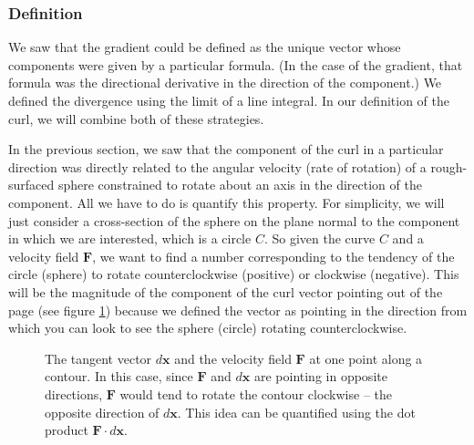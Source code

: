 \documentclass{myarticle}
\renewcommand{\vec}[1]{\mathbf{#1}}
\theoremstyle{nospace}
\newtheorem{old series theorem}{Theorem}
\newenvironment{series theorem}
{\begin{mdframed}\begin{old series theorem}}
    {\end{old series theorem}\end{mdframed}}
\begin{document}
\subsubsection{Definition}
\label{sec:curl definition}

We saw that the gradient could be defined as the unique vector whose
components were given by a particular formula. (In the case of the
gradient, that formula was the directional derivative in the direction
of the component.) We defined the divergence using the limit of a line
integral. In our definition of the curl, we will combine both of these
strategies.

In the previous section, we saw that the component of the curl in a
particular direction was directly related to the angular velocity
(rate of rotation) of a rough-surfaced sphere constrained to rotate
about an axis in the direction of the component. All we have to do is
quantify this property. For simplicity, we will just consider a
cross-section of the sphere on the plane normal to the component in
which we are interested, which is a circle $C$. So given the curve $C$
and a velocity field $\vec{F}$, we want to find a number corresponding
to the tendency of the circle (sphere) to rotate counterclockwise
(positive) or clockwise (negative). This will be the magnitude of the
component of the curl vector pointing out of the page (see figure
\ref{fig:curl circle}) because we defined the vector as pointing in
the direction from which you can look to see the sphere (circle)
rotating counterclockwise.

\begin{figure}[htb!] \centering
  \caption{The tangent vector $d\vec{x}$ and the velocity field
    $\vec{F}$ at one point along a contour. In this case, since
    $\vec{F}$ and $d\vec{x}$ are pointing in opposite directions,
    $\vec{F}$ would tend to rotate the contour clockwise -- the
    opposite direction of $d\vec{x}$. This idea can be quantified
    using the dot product $\vec{F} \cdot d\vec{x}$.}
  \label{fig:curl circle}
\end{figure}
\end{document}
